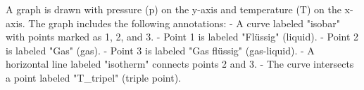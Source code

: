A graph is drawn with pressure (p) on the y-axis and temperature (T) on the x-axis. The graph includes the following annotations:  
- A curve labeled "isobar" with points marked as 1, 2, and 3.  
- Point 1 is labeled "Flüssig" (liquid).  
- Point 2 is labeled "Gas" (gas).  
- Point 3 is labeled "Gas flüssig" (gas-liquid).  
- A horizontal line labeled "isotherm" connects points 2 and 3.  
- The curve intersects a point labeled "T_tripel" (triple point).